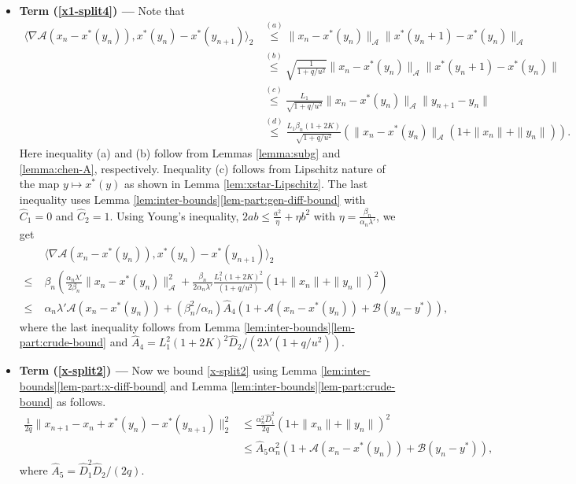 \documentclass[letterpaper, 10 pt, conference]{ieeeconf}  %
\theoremstyle{definition}
\theoremstyle{plain}
\newcommand{\xstar}{x^*}
\newcommand{\hA}{\hat{A}}
\newcommand{\hC}{\hat{C}}
\newcommand{\hD}{\hat{D}}
\newcommand{\Acal}{\mathcal{A}}
\newcommand{\Bcal}{\mathcal{B}}
\begin{document}
\begin{itemize}
\item \textbf{Term (\ref{x1-split4}) ---} Note that 
\begin{align*}
    \langle\nabla \Acal(x_n-\xstar(y_n)),\xstar(y_n)-\xstar(y_{n+1})\rangle_2&\stackrel{(a)}{\leq} \|x_n-\xstar(y_n)\|_\Acal\|\xstar(y_n+1)-\xstar(y_n)\|_\Acal\\
    &\stackrel{(b)}{\leq} \sqrt{\frac{1}{1+q/u^2}}\|x_n-\xstar(y_n)\|_\Acal\|\xstar(y_n+1)-\xstar(y_n)\|\\
    &\stackrel{(c)}{\leq} \frac{L_1}{\sqrt{1+q/u^2}}\|x_n-\xstar(y_n)\|_\Acal\|y_{n+1}-y_n\|\\
    &\stackrel{(d)}{\leq} \frac{L_1\beta_n(1+2K)}{\sqrt{1+q/u^2}}\left(\|x_n-\xstar(y_n)\|_\Acal(1+\|x_n\|+\|y_n\|)\right).
\end{align*}
Here inequality (a) and (b) follow from Lemmas \ref{lemma:subg} and \ref{lemma:chen-A}, respectively. Inequality (c) follows from Lipschitz nature of the map $y\mapsto \xstar(y)$ as shown in Lemma \ref{lem:xstar-Lipschitz}. The last inequality uses Lemma \ref{lem:inter-bounds}\ref{lem-part:gen-diff-bound} with $\hC_1=0$ and $\hC_2=1$. Using Young's inequality, $2ab\leq \frac{a^2}{\eta}+\eta b^2$ with $\eta=\frac{\beta_n}{\alpha_n\lambda'}$, we get
\begin{align*}
    &\langle\nabla \Acal(x_n-\xstar(y_n)),\xstar(y_n)-\xstar(y_{n+1})\rangle_2\\
    \leq\;& \beta_n\left(\frac{\alpha_n\lambda'}{2\beta_n}\|x_n-\xstar(y_n)\|^2_\Acal+\frac{\beta_n}{2\alpha_n\lambda'}\frac{L_1^2(1+2K)^2}{(1+q/u^2)}(1+\|x_n\|+\|y_n\|)^2\right)\\
    \leq\;& \alpha_n\lambda'\Acal(x_n-\xstar(y_n))+(\beta_n^2/\alpha_n)\hA_4\left(1+\Acal(x_n-x^*(y_n))+\Bcal(y_n-y^*)\right),
\end{align*}
where the last inequality follows from Lemma \ref{lem:inter-bounds}\ref{lem-part:crude-bound} and $\hA_4=L_1^2(1+2K)^2\hD_2/(2\lambda'(1+q/u^2))$.
\item \textbf{Term (\ref{x-split2}) ---} Now we bound \eqref{x-split2} using Lemma \ref{lem:inter-bounds}\ref{lem-part:x-diff-bound} and Lemma \ref{lem:inter-bounds}\ref{lem-part:crude-bound} as follows.
\begin{align*}
    \frac{1}{2q}\|x_{n+1}-x_n+\xstar(y_n)-\xstar(y_{n+1})\|_2^2&\leq \frac{\alpha_n^2\hD_1^2}{2q}(1+\|x_n\|+\|y_n\|)^2\\
    &\leq \hA_5\alpha_n^2\left(1+\Acal(x_n-x^*(y_n))+\Bcal(y_n-y^*)\right),
\end{align*}
where $\hA_5=\hD_1^2\hD_2/(2q)$.
\end{itemize}
\end{document}
